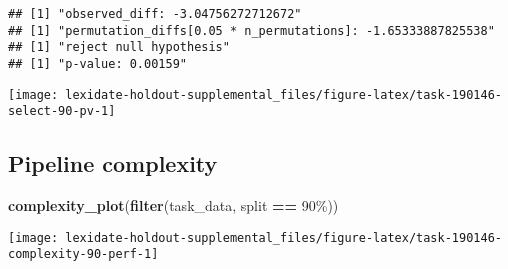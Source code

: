 \documentclass[
]{book}
\newenvironment{Shaded}{\begin{snugshade}}{\end{snugshade}}
\newcommand{\AttributeTok}[1]{\textcolor[rgb]{0.13,0.29,0.53}{#1}}
\newcommand{\DecValTok}[1]{\textcolor[rgb]{0.00,0.00,0.81}{#1}}
\newcommand{\FunctionTok}[1]{\textcolor[rgb]{0.13,0.29,0.53}{\textbf{#1}}}
\newcommand{\NormalTok}[1]{#1}
\newcommand{\OtherTok}[1]{\textcolor[rgb]{0.56,0.35,0.01}{#1}}
\newcommand{\SpecialCharTok}[1]{\textcolor[rgb]{0.81,0.36,0.00}{\textbf{#1}}}
\newcommand{\StringTok}[1]{\textcolor[rgb]{0.31,0.60,0.02}{#1}}
\begin{document}
\begin{Shaded}
\end{Shaded}

\begin{verbatim}
## [1] "observed_diff: -3.04756272712672"
## [1] "permutation_diffs[0.05 * n_permutations]: -1.65333887825538"
## [1] "reject null hypothesis"
## [1] "p-value: 0.00159"
\end{verbatim}

\texttt{[image: lexidate-holdout-supplemental\_files/figure-latex/task-190146-select-90-pv-1]}

\hypertarget{pipeline-complexity-17}{%
\subsection{Pipeline complexity}\label{pipeline-complexity-17}}

\begin{Shaded}
\begin{Highlighting}[]
\FunctionTok{complexity\_plot}\NormalTok{(}\FunctionTok{filter}\NormalTok{(task\_data, split }\SpecialCharTok{==} \StringTok{\textquotesingle{}90\%\textquotesingle{}}\NormalTok{))}
\end{Highlighting}
\end{Shaded}

\texttt{[image: lexidate-holdout-supplemental\_files/figure-latex/task-190146-complexity-90-perf-1]}
\end{document}
